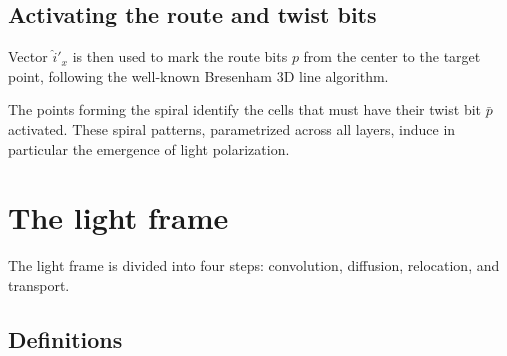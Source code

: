\documentclass[12pt,english]{article}
\begin{document}
\subsection{Activating the route and twist bits}
Vector $\hat{i}'_x$ is then used to mark the route bits $p$ from the center to the target point, following the well-known Bresenham 3D line algorithm. 

The points forming the spiral identify the cells that must have their twist bit $\bar{p}$ activated. These spiral patterns, parametrized across all layers, induce in particular the emergence of light polarization.



\section{The light frame}\label{sec:light-frame}

The light frame is divided into four steps: convolution, diffusion, relocation, and transport. 

\subsection{Definitions\label{subsec:Definitions}}
\end{document}
